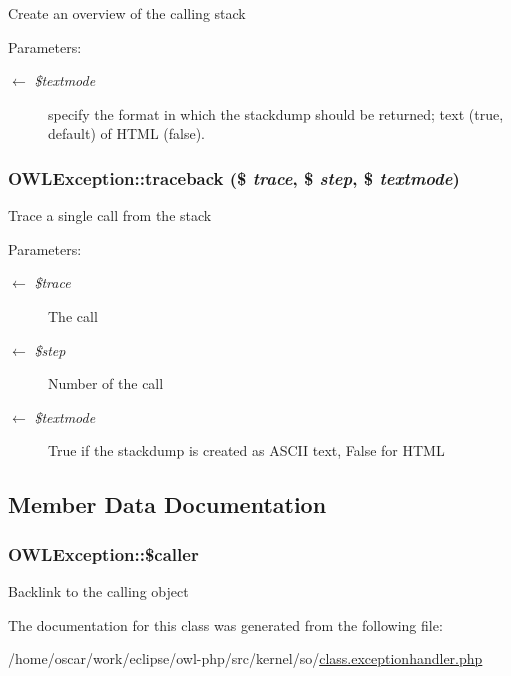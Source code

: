 Create an overview of the calling stack

\begin{Desc}
\item[Parameters:]
\begin{description}
\item[\mbox{$\leftarrow$} {\em \$textmode}]specify the format in which the stackdump should be returned; text (true, default) of HTML (false). \end{description}
\end{Desc}
\hypertarget{classOWLException_6e857cc079ee29428791e4926fe1677a}{
\subsubsection{\setlength{\rightskip}{0pt plus 5cm}OWLException::traceback (\$ {\em trace}, \$ {\em step}, \$ {\em textmode})}}
\label{classOWLException_6e857cc079ee29428791e4926fe1677a}


Trace a single call from the stack

\begin{Desc}
\item[Parameters:]
\begin{description}
\item[\mbox{$\leftarrow$} {\em \$trace}]The call \item[\mbox{$\leftarrow$} {\em \$step}]Number of the call \item[\mbox{$\leftarrow$} {\em \$textmode}]True if the stackdump is created as ASCII text, False for HTML \end{description}
\end{Desc}


\subsection{Member Data Documentation}
\hypertarget{classOWLException_f59d0890c1de1187f43084ec617545f1}{
\subsubsection{\setlength{\rightskip}{0pt plus 5cm}OWLException::\$caller}}
\label{classOWLException_f59d0890c1de1187f43084ec617545f1}


Backlink to the calling object 

The documentation for this class was generated from the following file:\begin{CompactItemize}
\item 
/home/oscar/work/eclipse/owl-php/src/kernel/so/\hyperlink{class_8exceptionhandler_8php}{class.exceptionhandler.php}\end{CompactItemize}
